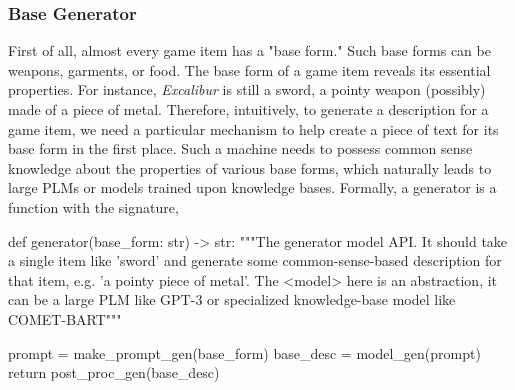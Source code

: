 \documentclass[12pt]{article}
\begin{document}
    \subsubsection{Base Generator}
    First of all, almost every game item has a "base form." Such base forms can be weapons, 
      garments, or food. The base form of a game item reveals its essential properties. 
      For instance, \textit{Excalibur} is still a sword, a pointy weapon (possibly) made of a 
      piece of metal. Therefore, intuitively, to generate a description for a game item, 
      we need a particular mechanism to help create a piece of text for its base form in 
      the first place. Such a machine needs to possess common sense knowledge about the 
      properties of various base forms, which naturally leads to large PLMs or models 
      trained upon knowledge bases. Formally, a generator is a function with the signature,
      \begin{python}

          def generator(base_form: str) -> str:
              """The generator model API. It should take a single 
                  item like 'sword' and generate some common-sense-based 
                  description for that item, e.g. 'a pointy piece of metal'.
                  The <model> here is an abstraction, it can be a large PLM 
                  like GPT-3 or specialized knowledge-base model like COMET-BART"""

              prompt = make_prompt_gen(base_form)
              base_desc = model_gen(prompt)
              return post_proc_gen(base_desc)
      \end{python}
\end{document}
